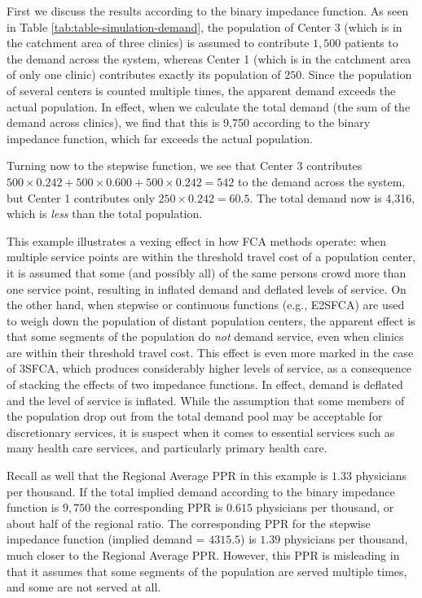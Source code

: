 \documentclass[10pt,letterpaper]{article}
\begin{document}
First we discuss the results according to the binary impedance function.
As seen in Table \ref{tab:table-simulation-demand}, the population of
Center 3 (which is in the catchment area of three clinics) is assumed to
contribute \(1,500\) patients to the demand across the system, whereas
Center 1 (which is in the catchment area of only one clinic) contributes
exactly its population of \(250\). Since the population of several
centers is counted multiple times, the apparent demand exceeds the
actual population. In effect, when we calculate the total demand (the
sum of the demand across clinics), we find that this is 9,750 according
to the binary impedance function, which far exceeds the actual
population.

Turning now to the stepwise function, we see that Center 3 contributes
\(500 \times 0.242 + 500 \times 0.600 + 500 \times 0.242 = 542\) to the
demand across the system, but Center 1 contributes only
\(250 \times 0.242= 60.5\). The total demand now is 4,316, which is
\emph{less} than the total population.

This example illustrates a vexing effect in how FCA methods operate:
when multiple service points are within the threshold travel cost of a
population center, it is assumed that some (and possibly all) of the
same persons crowd more than one service point, resulting in inflated
demand and deflated levels of service. On the other hand, when stepwise
or continuous functions (e.g., E2SFCA) are used to weigh down the
population of distant population centers, the apparent effect is that
some segments of the population do \emph{not} demand service, even when
clinics are within their threshold travel cost. This effect is even more
marked in the case of 3SFCA, which produces considerably higher levels
of service, as a consequence of stacking the effects of two impedance
functions. In effect, demand is deflated and the level of service is
inflated. While the assumption that some members of the population drop
out from the total demand pool may be acceptable for discretionary
services, it is suspect when it comes to essential services such as many
health care services, and particularly primary health care.

Recall as well that the Regional Average PPR in this example is \(1.33\)
physicians per thousand. If the total implied demand according to the
binary impedance function is \(9,750\) the corresponding PPR is
\(0.615\) physicians per thousand, or about half of the regional ratio.
The corresponding PPR for the stepwise impedance function (implied
demand = \(4315.5\)) is \(1.39\) physicians per thousand, much closer to
the Regional Average PPR. However, this PPR is misleading in that it
assumes that some segments of the population are served multiple times,
and some are not served at all.
\end{document}
